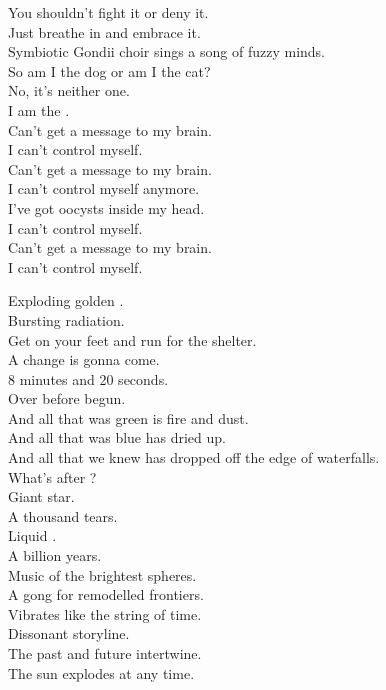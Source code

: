 You shouldn't fight it or deny it. \\
Just breathe in and embrace it. \\
Symbiotic Gondii choir sings a song of fuzzy minds. \\

So am I the dog or am I the cat? \\
No, it's neither one. \\
I am the . \\

Can't get a message to my brain. \\
I can't control myself. \\
Can't get a message to my brain. \\
I can't control myself anymore. \\
I've got oocysts inside my head. \\
I can't control myself. \\
Can't get a message to my brain. \\
I can't control myself. \\




Exploding golden . \\
Bursting radiation. \\
Get on your feet and run for the shelter. \\
A change is gonna come. \\
8 minutes and 20 seconds. \\
Over before begun. \\

And all that was green is fire and dust. \\
And all that was blue has dried up. \\
And all that we knew has dropped off the edge of waterfalls. \\
What's after ? \\

Giant star. \\
A thousand tears. \\
Liquid . \\
A billion years. \\
Music of the brightest spheres. \\
A gong for remodelled frontiers. \\
Vibrates like the string of time. \\
Dissonant storyline. \\
The past and future intertwine. \\
The sun explodes at any time. \\

